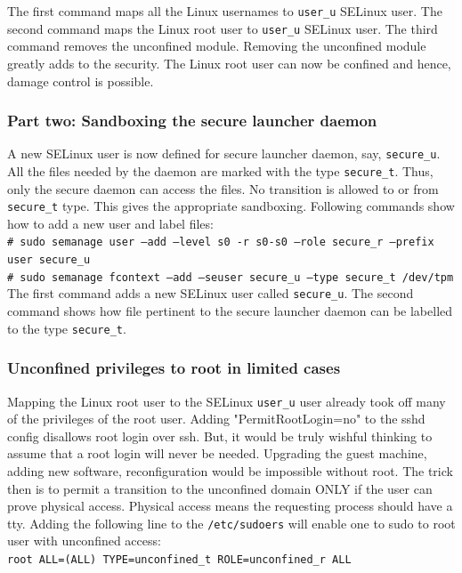 \documentclass[10pt,twocolumn,pdftex]{article}
\begin{document}
The first command maps all the Linux usernames to {\tt user\_u} SELinux user. The second command maps the Linux root user to {\tt user\_u} SELinux user.  The third command removes the unconfined module. Removing the unconfined module greatly adds to the security. The Linux root user can now be confined and hence, damage control is possible.

\subsubsection{Part two: Sandboxing the secure launcher daemon}
A new SELinux user is now defined for secure launcher daemon, say, {\tt secure\_u}. All the files needed by the daemon are marked with the type {\tt secure\_t}. Thus, only the secure daemon can access the files. No transition is allowed to or from {\tt secure\_t} type. This gives the appropriate sandboxing. Following commands show how to add a new user and label files: \\
{\tt \# sudo semanage user --add --level s0 -r s0-s0 --role secure\_r --prefix user secure\_u}\\
{\tt \# sudo semanage fcontext --add --seuser secure\_u --type secure\_t /dev/tpm}\\

The first command adds a new SELinux user called {\tt secure\_u}. The second command shows how file pertinent to the secure launcher daemon can be labelled to the type {\tt secure\_t}. 

\subsubsection{Unconfined privileges to root in limited cases}
Mapping the Linux root user to the SELinux {\tt user\_u} user already took off many of the privileges of the root user. Adding "PermitRootLogin=no" to the sshd config disallows root login over ssh. But, it would be truly wishful thinking to assume that a root login will never be needed. Upgrading the guest machine, adding new software, reconfiguration would be impossible without root. The trick then is to permit a transition to the unconfined domain ONLY if the user can prove physical access. Physical access means the requesting process should have a tty. Adding the following line to the {\tt /etc/sudoers} will enable one to sudo to root user with unconfined access: \\

{\tt root ALL=(ALL) TYPE=unconfined\_t ROLE=unconfined\_r ALL} \\
\end{document}
